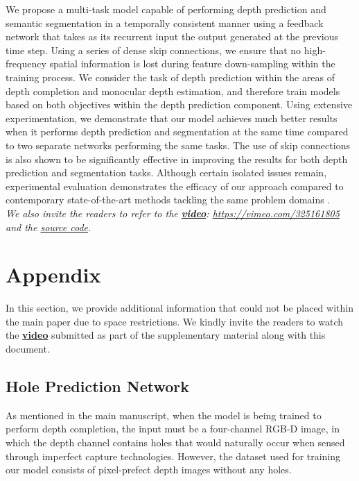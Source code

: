 \documentclass[10pt,twocolumn,letterpaper]{article}
\begin{document}
{We propose a multi-task model capable of performing depth prediction and semantic segmentation in a temporally consistent manner using a feedback network that takes as its recurrent input the output generated at the previous time step. Using a series of dense skip connections, we ensure that no high-frequency spatial information is lost during feature down-sampling within the training process. We consider the task of depth prediction within the areas of depth completion and monocular depth estimation, and therefore train models based on both objectives within the depth prediction component. Using extensive experimentation, we demonstrate that our model achieves much better results when it performs depth prediction and segmentation at the same time compared to two separate networks performing the same tasks. The use of skip connections is also shown to be significantly effective in improving the results for both depth prediction and segmentation tasks. Although certain isolated issues remain, experimental evaluation demonstrates the efficacy of our approach compared to contemporary state-of-the-art methods tackling the same problem domains \cite{chen2018deeplab, monodepth17, iizuka2017globally, kendall2017bayesian, long2015fully, yu2018generative, zhan2018unsupervised, zhou2017unsupervised}.\\
\textit{We also invite the readers to refer to the \href{https://vimeo.com/325161805}{\textbf{video}}: \href{https://vimeo.com/325161805}{https://vimeo.com/325161805} and the \href{https://github.com/atapour/temporal-depth-segmentation}{source code}.}

{\small


}

\clearpage{}\section{Appendix}

In this section, we provide additional information that could not be placed within the main paper due to space restrictions. We kindly invite the readers to watch the \href{https://vimeo.com/325161805}{\textbf{video}} submitted as part of the supplementary material along with this document.

\subsection{Hole Prediction Network}

As mentioned in the main manuscript, when the model is being trained to perform depth completion, the input must be a four-channel RGB-D image, in which the depth channel contains holes that would naturally occur when sensed through imperfect capture technologies. However, the dataset used for training our model \cite{RosCVPR16} consists of pixel-prefect depth images without any holes.

}
\end{document}
